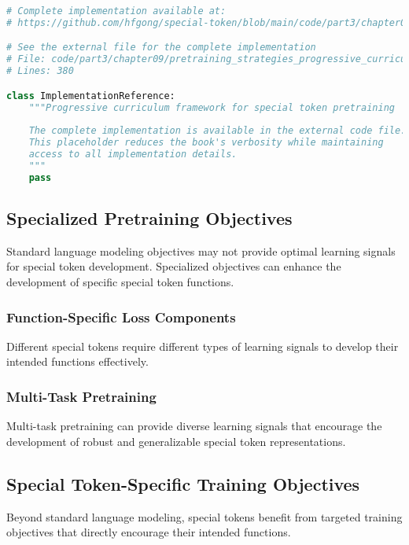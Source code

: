 \begin{lstlisting}[language=Python, caption={Progressive curriculum framework for special token pretraining}]
# Complete implementation available at:
# https://github.com/hfgong/special-token/blob/main/code/part3/chapter09/pretraining_strategies_progressive_curriculum_framewo.py

# See the external file for the complete implementation
# File: code/part3/chapter09/pretraining_strategies_progressive_curriculum_framewo.py
# Lines: 380

class ImplementationReference:
    """Progressive curriculum framework for special token pretraining
    
    The complete implementation is available in the external code file.
    This placeholder reduces the book's verbosity while maintaining
    access to all implementation details.
    """
    pass
\end{lstlisting}

\subsection{Specialized Pretraining Objectives}

Standard language modeling objectives may not provide optimal learning signals for special token development. Specialized objectives can enhance the development of specific special token functions.

\subsubsection{Function-Specific Loss Components}

Different special tokens require different types of learning signals to develop their intended functions effectively.

\subsubsection{Multi-Task Pretraining}

Multi-task pretraining can provide diverse learning signals that encourage the development of robust and generalizable special token representations.

\subsection{Special Token-Specific Training Objectives}

Beyond standard language modeling, special tokens benefit from targeted training objectives that directly encourage their intended functions.

